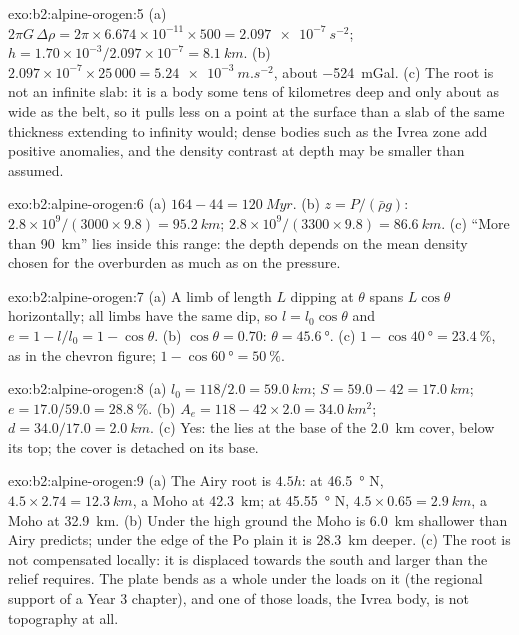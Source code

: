 \begin{solution}{exo:b2:alpine-orogen:5}
(a) $2\pi G\,\Delta\rho = 2\pi\times6.674\times10^{-11}\times500 =
\qty{2.097e-7}{s^{-2}}$; $h = 1.70\times10^{-3}/2.097\times10^{-7} = \qty{8.1}{km}$.
(b) $2.097\times10^{-7}\times25\,000 = \qty{5.24e-3}{m.s^{-2}}$, about
\qty{-524}{mGal}. (c) The root is not an infinite slab: it is a body some tens of kilometres
deep and only about as wide as the belt, so it pulls less on a point at the surface than a
slab of the same thickness extending to infinity would; dense bodies such as the Ivrea zone
add positive anomalies, and the density contrast at depth may be smaller than assumed.
\end{solution}

\begin{solution}{exo:b2:alpine-orogen:6}
(a) $164 - 44 = \qty{120}{Myr}$. (b) $z = P/(\bar\rho g)$:
$2.8\times10^9/(3000\times9.8) = \qty{95.2}{km}$; $2.8\times10^9/(3300\times9.8) =
\qty{86.6}{km}$. (c) ``More than \qty{90}{km}'' lies inside this range: the depth depends on
the mean density chosen for the overburden as much as on the pressure.
\end{solution}

\begin{solution}{exo:b2:alpine-orogen:7}
(a) A limb of length $L$ dipping at $\theta$ spans $L\cos\theta$ horizontally; all limbs
have the same dip, so $l = l_0\cos\theta$ and $e = 1 - l/l_0 = 1 - \cos\theta$.
(b) $\cos\theta = 0.70$: $\theta = \qty{45.6}{\degree}$. (c) $1 - \cos\qty{40}{\degree} =
\qty{23.4}{\percent}$, as in the chevron figure; $1 - \cos\qty{60}{\degree}
= \qty{50}{\percent}$.
\end{solution}

\begin{solution}{exo:b2:alpine-orogen:8}
(a) $l_0 = 118/2.0 = \qty{59.0}{km}$; $S = 59.0 - 42 = \qty{17.0}{km}$; $e = 17.0/59.0 =
\qty{28.8}{\percent}$. (b) $A_e = 118 - 42\times2.0 = \qty{34.0}{km^2}$; $d = 34.0/17.0 =
\qty{2.0}{km}$. (c) Yes: the  lies at the base of the \qty{2.0}{km} cover, below
its top; the cover is detached on its base.
\end{solution}

\begin{solution}{exo:b2:alpine-orogen:9}
(a) The Airy root is $4.5h$: at \qty{46.5}{\degree} N, $4.5\times2.74 = \qty{12.3}{km}$, a
Moho at \qty{42.3}{km}; at \qty{45.55}{\degree} N, $4.5\times0.65 = \qty{2.9}{km}$, a Moho
at \qty{32.9}{km}. (b) Under the high ground the Moho is \qty{6.0}{km} shallower than Airy
predicts; under the edge of the Po plain it is \qty{28.3}{km} deeper. (c) The root is not
compensated locally: it is displaced towards the south and larger than the relief requires.
The plate bends as a whole under the loads on it (the regional support of a Year 3
chapter), and one of those loads, the Ivrea body, is not topography at all.
\end{solution}

